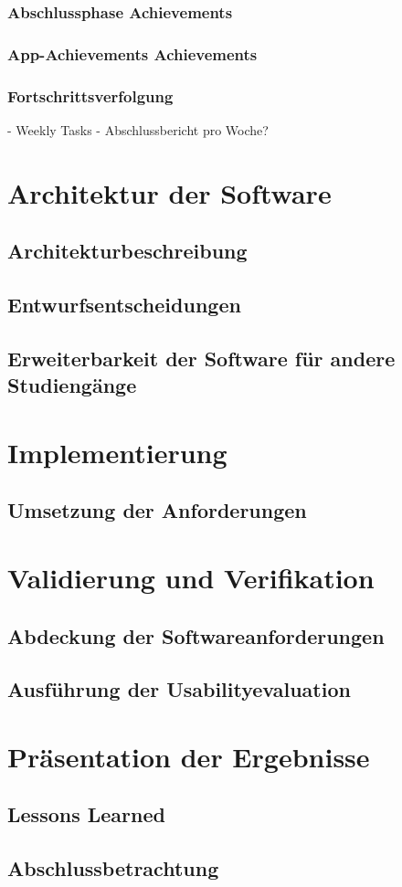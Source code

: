 \documentclass{scrreprt}
\begin{document}
\subsection{Abschlussphase Achievements}
\subsection{App-Achievements Achievements}
\subsection{Fortschrittsverfolgung}
- Weekly Tasks
- Abschlussbericht pro Woche?

\chapter{Architektur der Software} \label{chap:architektur}
\section{Architekturbeschreibung}
\section{Entwurfsentscheidungen}
\section{Erweiterbarkeit der Software für andere Studiengänge}
\chapter{Implementierung} \label{chap:implementierung}
\section{Umsetzung der Anforderungen}

\chapter{Validierung und Verifikation} \label{chap:nachweisführung}
\section{Abdeckung der Softwareanforderungen}
\section{Ausführung der Usabilityevaluation}

\chapter{Präsentation der Ergebnisse} \label{chap:ergebnisse}
\section{Lessons Learned}
\section{Abschlussbetrachtung}

\nocite{*}
\printbibliography
\end{document}
